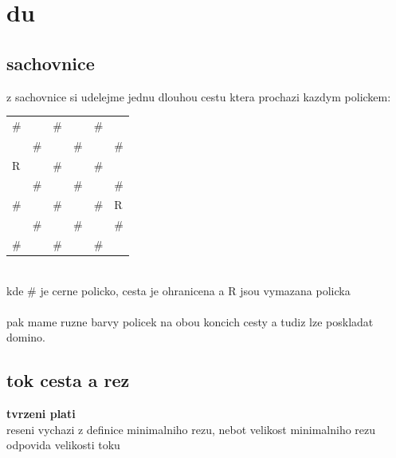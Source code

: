 \documentclass[a4paper]{article}
\begin{document}
\pagestyle{fancy}

\setcounter{section}{2}
\section{du}
\subsection{sachovnice}
z sachovnice si udelejme jednu dlouhou cestu ktera prochazi kazdym polickem:\\
\begin{tabular}{|l|l|l|l|l|l|} 
\hline
\multicolumn{1}{|l}{\#} & \multicolumn{1}{l}{}   & \multicolumn{1}{l}{\#} & \multicolumn{1}{l}{}   & \multicolumn{1}{l}{\#} &     \\ 
\cline{2-5}
                        & \multicolumn{1}{l}{\#} &                        & \multicolumn{1}{l}{\#} &                        & \#  \\
R                       &                        & \#                     &                        & \#                     &     \\
                        & \#                     &                        & \#                     &                        & \#  \\
\#                      &                        & \#                     &                        & \#                     & R   \\
                        & \#                     &                        & \#                     &                        & \#  \\
\multicolumn{1}{|l}{\#} &                        & \multicolumn{1}{l}{\#} &                        & \multicolumn{1}{l}{\#} &     \\
\hline
\end{tabular}\\
kde \# je cerne policko, cesta je ohranicena a R jsou vymazana policka\\
\\
pak mame ruzne barvy policek na obou koncich cesty a tudiz lze poskladat domino.

\subsection{tok cesta a rez}
\textbf{tvrzeni plati}\\
reseni vychazi z definice minimalniho rezu, nebot velikost minimalniho rezu odpovida velikosti toku
\end{document}
